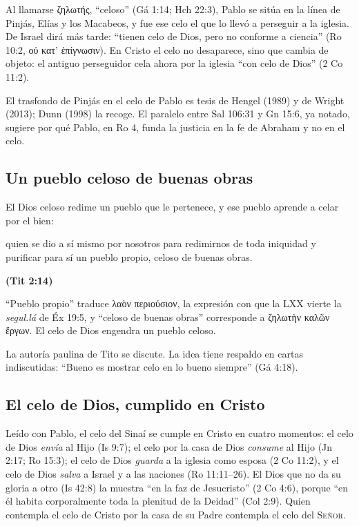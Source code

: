 \documentclass[11pt,letterpaper]{article}
\newcommand{\grc}[1]{\foreignlanguage{ancientgreek}{#1}}
\newcommand{\SENOR}{\textsc{Señor}}
\newcommand{\fuente}[1]{\par\hfill{\upshape\bfseries\small\textcolor{azul}{#1}}}
\begin{document}
Al llamarse \grc{ζηλωτής}, ``celoso'' (Gá 1:14; Hch 22:3), Pablo se sitúa en la línea de Pinjás, Elías y los Macabeos, y fue ese celo el que lo llevó a perseguir a la iglesia. De Israel dirá más tarde: ``tienen celo de Dios, pero no conforme a ciencia'' (Ro 10:2, \grc{οὐ κατ’ ἐπίγνωσιν}). En Cristo el celo no desaparece, sino que cambia de objeto: el antiguo perseguidor cela ahora por la iglesia ``con celo de Dios'' (2 Co 11:2).

\begin{nota}[Precisión]
El trasfondo de Pinjás en el celo de Pablo es tesis de Hengel (1989) y de Wright (2013); Dunn (1998) la recoge. El paralelo entre Sal 106:31 y Gn 15:6, ya notado, sugiere por qué Pablo, en Ro 4, funda la justicia en la fe de Abraham y no en el celo.
\end{nota}

\subsection{Un pueblo celoso de buenas obras}
El Dios celoso redime un pueblo que le pertenece, y ese pueblo aprende a celar por el bien:

\begin{cita}quien se dio a sí mismo por nosotros para redimirnos de toda iniquidad y purificar para sí un pueblo propio, celoso de buenas obras.\fuente{(Tit 2:14)}\end{cita}

``Pueblo propio'' traduce \grc{λαὸν περιούσιον}, la expresión con que la LXX vierte la \emph{segul.lá} de Éx 19:5, y ``celoso de buenas obras'' corresponde a \grc{ζηλωτὴν καλῶν ἔργων}. El celo de Dios engendra un pueblo celoso.

\begin{nota}[Precisión]
La autoría paulina de Tito se discute. La idea tiene respaldo en cartas indiscutidas: ``Bueno es mostrar celo en lo bueno siempre'' (Gá 4:18).
\end{nota}

\subsection{El celo de Dios, cumplido en Cristo}
Leído con Pablo, el celo del Sinaí se cumple en Cristo en cuatro momentos: el celo de Dios \emph{envía} al Hijo (Is 9:7); el celo por la casa de Dios \emph{consume} al Hijo (Jn 2:17; Ro 15:3); el celo de Dios \emph{guarda} a la iglesia como esposa (2 Co 11:2), y el celo de Dios \emph{salva} a Israel y a las naciones (Ro 11:11--26). El Dios que no da su gloria a otro (Is 42:8) la muestra ``en la faz de Jesucristo'' (2 Co 4:6), porque ``en él habita corporalmente toda la plenitud de la Deidad'' (Col 2:9). Quien contempla el celo de Cristo por la casa de su Padre contempla el celo del \SENOR.
\end{document}
